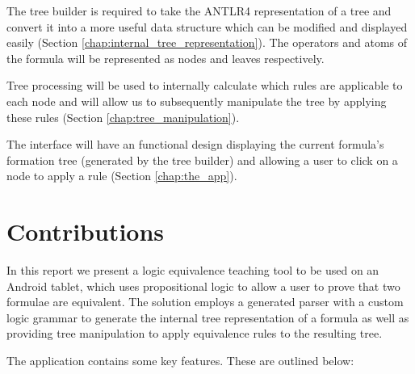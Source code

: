 \documentclass{report}
\begin{document}
The tree builder is required to take the ANTLR4 representation of a tree and convert it into a more useful data structure which can be modified and displayed easily (Section \ref{chap:internal_tree_representation}). The operators and atoms of the formula will be represented as nodes and leaves respectively.

Tree processing will be used to internally calculate which rules are applicable to each node and will allow us to subsequently manipulate the tree by applying these rules (Section \ref{chap:tree_manipulation}).

The interface will have an functional design displaying the current formula's formation tree (generated by the tree builder) and allowing a user to click on a node to apply a rule (Section \ref{chap:the_app}).

\section{Contributions}
\label{sec:objectives}

In this report we present a logic equivalence teaching tool to be used on an Android tablet, which uses propositional logic to allow a user to prove that two formulae are equivalent. The solution employs a generated parser with a custom logic grammar to generate the internal tree representation of a formula as well as providing tree manipulation to apply equivalence rules to the resulting tree. 

The application contains some key features. These are outlined below:
\end{document}
